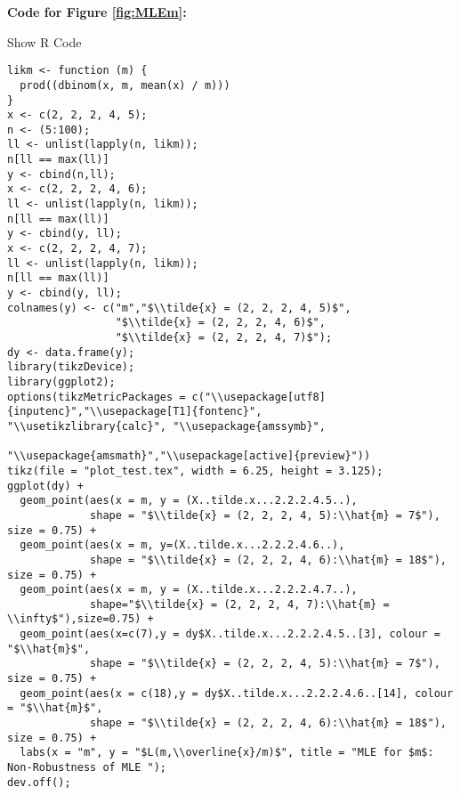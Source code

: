 \documentclass[]{book}
\theoremstyle{definition}
\theoremstyle{definition}
\theoremstyle{definition}
\theoremstyle{remark}
\begin{document}
\textbf{Code for Figure \ref{fig:MLEm}:}

Show R Code

\hypertarget{toggleCodeFreq.3}{}
\begin{verbatim}
likm <- function (m) {
  prod((dbinom(x, m, mean(x) / m)))
}
x <- c(2, 2, 2, 4, 5);
n <- (5:100);
ll <- unlist(lapply(n, likm));
n[ll == max(ll)]
y <- cbind(n,ll);
x <- c(2, 2, 2, 4, 6);
ll <- unlist(lapply(n, likm));
n[ll == max(ll)]
y <- cbind(y, ll);
x <- c(2, 2, 2, 4, 7);
ll <- unlist(lapply(n, likm));
n[ll == max(ll)]
y <- cbind(y, ll);
colnames(y) <- c("m","$\\tilde{x} = (2, 2, 2, 4, 5)$", 
                 "$\\tilde{x} = (2, 2, 2, 4, 6)$", 
                 "$\\tilde{x} = (2, 2, 2, 4, 7)$");
dy <- data.frame(y);
library(tikzDevice);
library(ggplot2);
options(tikzMetricPackages = c("\\usepackage[utf8]{inputenc}","\\usepackage[T1]{fontenc}",                                "\\usetikzlibrary{calc}", "\\usepackage{amssymb}",     
                               "\\usepackage{amsmath}","\\usepackage[active]{preview}"))
tikz(file = "plot_test.tex", width = 6.25, height = 3.125);
ggplot(dy) + 
  geom_point(aes(x = m, y = (X..tilde.x...2.2.2.4.5..), 
             shape = "$\\tilde{x} = (2, 2, 2, 4, 5):\\hat{m} = 7$"), size = 0.75) + 
  geom_point(aes(x = m, y=(X..tilde.x...2.2.2.4.6..), 
             shape = "$\\tilde{x} = (2, 2, 2, 4, 6):\\hat{m} = 18$"), size = 0.75) +
  geom_point(aes(x = m, y = (X..tilde.x...2.2.2.4.7..), 
             shape="$\\tilde{x} = (2, 2, 2, 4, 7):\\hat{m} = \\infty$"),size=0.75) +
  geom_point(aes(x=c(7),y = dy$X..tilde.x...2.2.2.4.5..[3], colour = "$\\hat{m}$", 
             shape = "$\\tilde{x} = (2, 2, 2, 4, 5):\\hat{m} = 7$"), size = 0.75) +
  geom_point(aes(x = c(18),y = dy$X..tilde.x...2.2.2.4.6..[14], colour = "$\\hat{m}$",   
             shape = "$\\tilde{x} = (2, 2, 2, 4, 6):\\hat{m} = 18$"), size = 0.75) +
  labs(x = "m", y = "$L(m,\\overline{x}/m)$", title = "MLE for $m$: Non-Robustness of MLE "); 
dev.off();
\end{verbatim}
\end{document}
